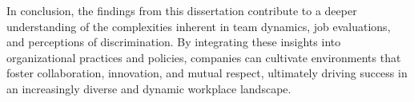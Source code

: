 In conclusion, the findings from this dissertation contribute to a deeper understanding of the complexities inherent in team dynamics, job evaluations, and perceptions of discrimination. By integrating these insights into organizational practices and policies, companies can cultivate environments that foster collaboration, innovation, and mutual respect, ultimately driving success in an increasingly diverse and dynamic workplace landscape.




